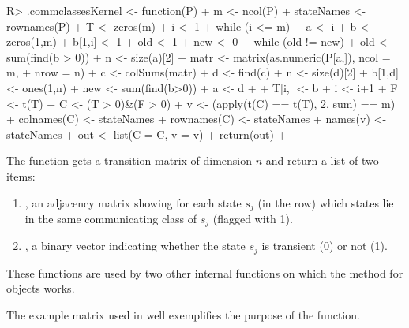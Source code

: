 \documentclass[nojss]{jss}
\begin{document}
\begin{Schunk}
\begin{Sinput}
R> .commclassesKernel <- function(P){
+    m <- ncol(P)
+  	stateNames <- rownames(P)
+  	T <- zeros(m) 
+  	i <- 1
+  	while (i <= m) { 
+  		a <- i 
+  		b <- zeros(1,m)
+  		b[1,i] <- 1
+  		old <- 1
+  		new <- 0
+  		while (old != new) {
+  			old <- sum(find(b > 0))
+  			n <- size(a)[2]
+  			matr <- matrix(as.numeric(P[a,]), ncol = m, 
+                       nrow = n)
+  			c <- colSums(matr)
+  			d <- find(c)
+  			n <- size(d)[2]
+  			b[1,d] <- ones(1,n)
+  			new <- sum(find(b>0))
+  			a <- d
+  		}
+  		T[i,] <- b
+  		i <- i+1 }
+  	F <- t(T)  
+  	C <- (T > 0)&(F > 0)
+  	v <- (apply(t(C) == t(T), 2, sum) == m)
+  	colnames(C) <- stateNames
+  	rownames(C) <- stateNames
+  	names(v) <- stateNames
+  	out <- list(C = C, v = v)
+  	return(out)
+  }
\end{Sinput}
\end{Schunk}

The  function gets a transition matrix of dimension $n$ and return a list of two items:

\begin{enumerate}
\item {}, an adjacency matrix showing for each state $s_{j}$ (in the row) which states lie in the same communicating class of $s_{j}$ 
(flagged with 1).
\item {}, a binary vector indicating whether the state $s_{j}$ is
transient (0) or not (1).
\end{enumerate}

These functions are used by two other internal functions on which the  method for  objects works.

The example matrix used in \cite{renaldoMatlab} well exemplifies the purpose of the function. 
\end{document}
